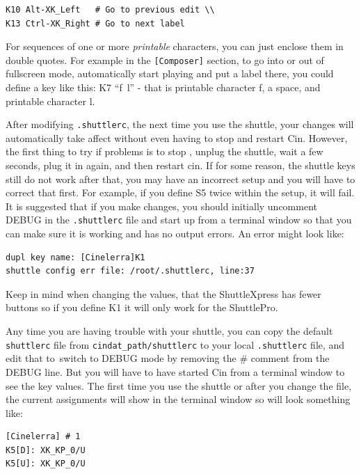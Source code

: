\begin{lstlisting}[style=sh]
K10 Alt-XK_Left	  # Go to previous edit \\
K13 Ctrl-XK_Right # Go to next label
\end{lstlisting}

For sequences of one or more \textit{printable} characters, you can
just enclose them in double quotes.  For example in the
\texttt{[Composer]} section, to go into or out of fullscreen mode,
automatically start playing and put a label there, you could define
a key like this:  K7 “f~l” - that is printable character f, a space,
and printable character l.

After modifying \texttt{.shuttlerc}, the next time you use the
shuttle, your changes will automatically take affect without even
having to stop and restart Cin.  However, the first thing to try if
problems is to stop \CGG{}, unplug the shuttle, wait a few seconds,
plug it in again, and then restart cin.  If for some reason, the
shuttle keys still do not work after that, you may have an incorrect
setup and you will have to correct that first.  For example, if you
define S5 twice within the \CGG{} setup, it will fail.  It is
suggested that if you make changes, you should initially uncomment
DEBUG in the \texttt{.shuttlerc} file and start up \CGG{} from a
terminal window so that you can make sure it is working and has no
output errors.  An error might look like:

\begin{lstlisting}[style=sh]
dupl key name: [Cinelerra]K1
shuttle config err file: /root/.shuttlerc, line:37
\end{lstlisting}

Keep in mind when changing the values, that the ShuttleXpress has
fewer buttons so if you define K1 it will only work for the
ShuttlePro.

Any time you are having trouble with your shuttle, you can copy the
default \texttt{shuttlerc} file from
\texttt{{cindat\_path}/shuttlerc} to your local \texttt{.shuttlerc}
file, and edit that to\ switch to DEBUG mode by removing the \#
comment from the DEBUG line.  But you will have to have started Cin
from a terminal window to see the key values. The first time you use
the shuttle or after you change the file, the current assignments
will show in the terminal window so will look something like:

\begin{lstlisting}[style=sh]
[Cinelerra] # 1
K5[D]: XK_KP_0/U
K5[U]: XK_KP_0/U
\end{lstlisting}

